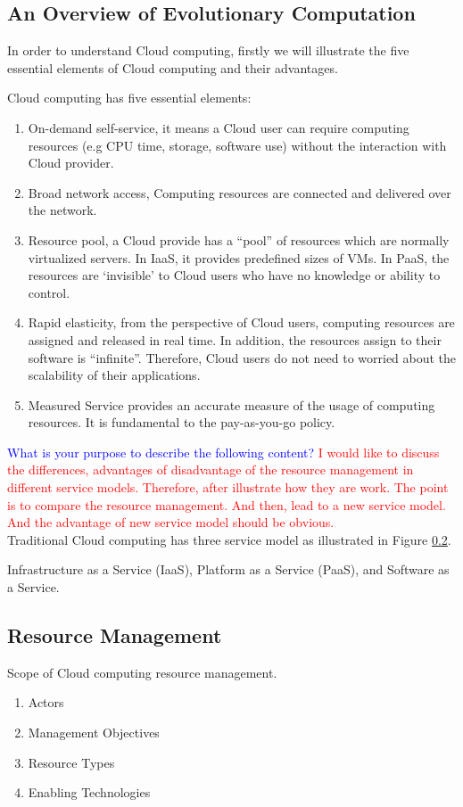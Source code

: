 \subsection{An Overview of Evolutionary Computation}


In order to understand Cloud computing, firstly we will illustrate the five essential elements of Cloud computing and their advantages.

Cloud computing has five essential elements:
\begin{enumerate}
 \item On-demand self-service, it means a Cloud user can require computing resources (e.g CPU time, storage, software use) without the interaction with Cloud provider.
 \item Broad network access, Computing resources are connected and delivered over the network.
 \item Resource pool, a Cloud provide has a ``pool'' of resources which are normally virtualized servers. In IaaS, it provides predefined sizes of VMs. In PaaS, the resources are `invisible' to Cloud users who have no knowledge or ability to control. 
 \item Rapid elasticity, from the perspective of Cloud users, computing resources are assigned and released in
real time. In addition, the resources assign to their software is ``infinite''. Therefore, Cloud users do not need to worried about the scalability of their applications.
 \item Measured Service provides an accurate measure of the usage of computing resources. It is fundamental to the pay-as-you-go policy.
\end{enumerate}

\textcolor{Blue}{What is your purpose to describe the following content?}
\textcolor{Red}{
	I would like to discuss the differences, advantages of disadvantage of the resource management in different service models. Therefore, after illustrate how they are work. The point is to compare the resource management. And then, lead to a new service model. And the advantage of new service model should be obvious. 
}\\
Traditional Cloud computing has three service model as illustrated in Figure \ref{}.
\begin{enumerate}


\end{enumerate}
Infrastructure as a Service (IaaS), Platform as a Service (PaaS), and Software as a Service. 
\subsection{Resource Management}
Scope of Cloud computing resource management.
\begin{enumerate}
 \item Actors
 \item Management Objectives
 \item Resource Types
 \item Enabling Technologies
\end{enumerate}






